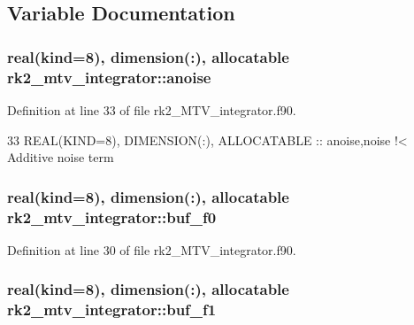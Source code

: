 \subsection{Variable Documentation}
\subsubsection[{\texorpdfstring{anoise}{anoise}}]{\setlength{\rightskip}{0pt plus 5cm}real(kind=8), dimension(\+:), allocatable rk2\+\_\+mtv\+\_\+integrator\+::anoise\hspace{0.3cm}{\ttfamily [private]}}\hypertarget{namespacerk2__mtv__integrator_ad88a9e896280f9afe3d00bf76fe0aa20}{}\label{namespacerk2__mtv__integrator_ad88a9e896280f9afe3d00bf76fe0aa20}


Definition at line 33 of file rk2\+\_\+\+M\+T\+V\+\_\+integrator.\+f90.


\begin{DoxyCode}
33   \textcolor{keywordtype}{REAL(KIND=8)}, \textcolor{keywordtype}{DIMENSION(:)}, \textcolor{keywordtype}{ALLOCATABLE} :: anoise,noise\textcolor{comment}{         !< Additive noise term}
\end{DoxyCode}
\subsubsection[{\texorpdfstring{buf\+\_\+f0}{buf_f0}}]{\setlength{\rightskip}{0pt plus 5cm}real(kind=8), dimension(\+:), allocatable rk2\+\_\+mtv\+\_\+integrator\+::buf\+\_\+f0\hspace{0.3cm}{\ttfamily [private]}}\hypertarget{namespacerk2__mtv__integrator_a8a81a8ea6d873549ea3fab2c25ab8f56}{}\label{namespacerk2__mtv__integrator_a8a81a8ea6d873549ea3fab2c25ab8f56}


Definition at line 30 of file rk2\+\_\+\+M\+T\+V\+\_\+integrator.\+f90.

\subsubsection[{\texorpdfstring{buf\+\_\+f1}{buf_f1}}]{\setlength{\rightskip}{0pt plus 5cm}real(kind=8), dimension(\+:), allocatable rk2\+\_\+mtv\+\_\+integrator\+::buf\+\_\+f1\hspace{0.3cm}{\ttfamily [private]}}\hypertarget{namespacerk2__mtv__integrator_a082b2bb51352639e114015017d7e8a8c}{}\label{namespacerk2__mtv__integrator_a082b2bb51352639e114015017d7e8a8c}


